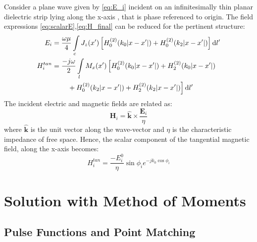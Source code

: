 \documentclass[11pt]{article}
\renewcommand{\v}[1]{\mathbf{#1}} %
\renewcommand{\O}{\omega}  %
\renewcommand{\u}{\mu}  %
\newcommand{\x}{\times}  %
\renewcommand{\^}{\hat}  %
\newcommand*\diff{\mathop{}\!\mathrm{d}} %
\begin{document}
Consider a plane wave given by \eqref{eq:E_i} incident on an infinitesimally thin planar dielectric strip lying along the x-axis , that is phase referenced to origin. The field expressions \eqref{eq:scalarE},\eqref{eq:H_final} can be reduced for the pertinent structure:
%
\begin{subequations}
  \begin{align}
    E_i &= \frac{\O \u}{4} \int\limits_c J_z(x') \left[ H_0^{(2)}(k_0 |x - x'|) + H_0^{(2)}(k_2 |x - x'|)\right] \diff{l'}
    \label{eq:E_plate}\\
    H_i^{tan} &=  \frac{-j \O}{2} \int\limits_{l} M_x(x') \left[ H_0^{(2)}(k_0 |x - x'|) + H_2^{(2)}(k_0 |x - x'|) \right. \notag\\
    &\qquad \left. {} + H_0^{(2)}(k_2 |x - x'|) + H_2^{(2)}(k_2 |x - x'|)\right]\diff{l'}
    \label{eq:H_plate}
  \end{align}
  \label{eq:plate}
\end{subequations}
%
The incident electric and magnetic fields are related as:
%
\begin{equation}
  \v H_i = \hat{\v k} \x \frac{\v E_i}{\eta}
  \label{eq:H_i}
\end{equation}
%
where $\hat{\v k}$ is the unit vector along the wave-vector and $\eta$ is the characteristic impedance of free space. Hence, the scalar component of the tangential magnetic field, along the x-axis becomes:
%
\begin{equation}
  H_i^{tan} = \frac{-E_i^0}{\eta} \sin \phi_i e^{-j k_0 \cos \phi_i}
  \label{eq:H_itan}
\end{equation}
%
\section{Solution with Method of Moments}

\subsection*{Pulse Functions and Point Matching}
\end{document}
